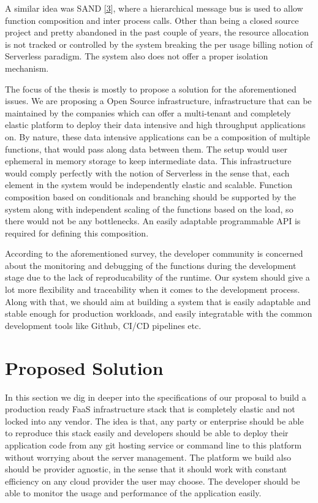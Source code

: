 \documentclass[12pt,titlepage]{article}
\begin{document}
A similar idea was SAND \hyperref[ref:3]{[3}], where a hierarchical message bus is used to allow
function composition and inter process calls. Other than being a closed source
project and pretty abandoned in the past couple of years, the resource
allocation is not tracked or controlled by the system breaking the per usage
billing notion of Serverless paradigm. The system also does not offer a
proper isolation mechanism.

The focus of the thesis is mostly to propose a solution for the aforementioned
issues. We are proposing a Open Source infrastructure, infrastructure that can
be maintained by the companies which can offer a multi-tenant and completely elastic
platform to deploy their data intensive and high throughput applications on.
By nature, these data intensive applications can be a composition of multiple
functions, that would pass along data between them. The setup would user
ephemeral in memory storage to keep intermediate data. This infrastructure
would comply perfectly with the notion of Serverless in the sense that, each
element in the system would be independently elastic and scalable. Function
composition based on conditionals and branching should be supported by the
system along with independent scaling of the functions based on the load, so
there would not be any bottlenecks. An easily adaptable programmable API is
required for defining this composition.

According to the aforementioned survey, the developer community is concerned
about the monitoring and debugging of the functions during the development stage
due to the lack of reproducability of the runtime. Our system should give a lot
more flexibility and traceability when it comes to the development process.
Along with that, we should aim at building a system that is easily adaptable and
stable enough for production workloads, and easily integratable with the common
development tools like Github, CI/CD pipelines etc.

\section{Proposed Solution}
\label{sec:org75db54c}

In this section we dig in deeper into the specifications of our proposal to
build a production ready FaaS infrastructure stack that is completely elastic
and not locked into any vendor. The idea is that, any party or enterprise should
be able to reproduce this stack easily and developers should be able to deploy their
application code from any git hosting service or command line to this platform
without worrying about the server management. The platform we build also should
be provider agnostic, in the sense that it should work with constant efficiency
on any cloud provider the user may choose. The developer should be able to
monitor the usage and performance of the application easily.
\end{document}
